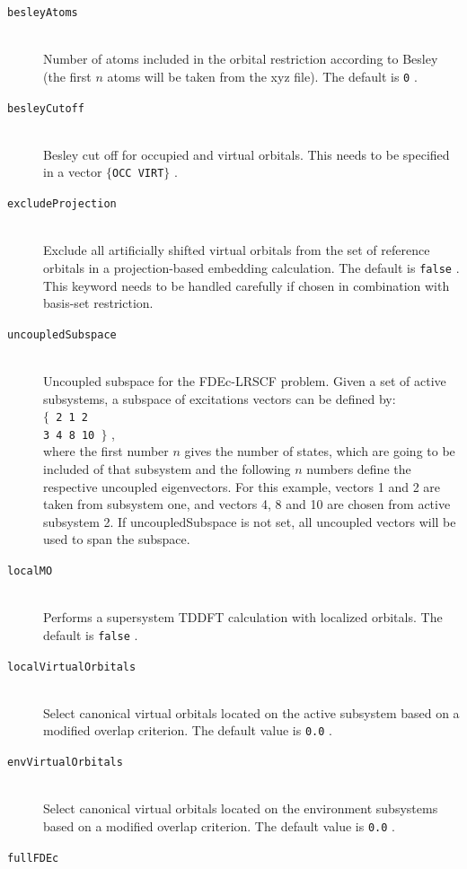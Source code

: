 \documentclass[bibliography=totocnumbered,a4paper,10pt,oneside]{scrbook}
\newcommand{\ttt}[1]{%
  \begingroup\setlength{\fboxsep}{1pt}%
  \colorbox{serenity-green!30}{\texttt{\hspace*{2pt}\vphantom{(g}#1\hspace*{2pt}}}%
  \endgroup
}
\begin{document}
\begin{description}
    \item [\texttt{besleyAtoms}]\hfill \\
    Number of atoms included in the orbital restriction according to Besley (the first $n$ atoms will be taken from the xyz file). The default is \ttt{0}.
    \item [\texttt{besleyCutoff}]\hfill \\
    Besley cut off for occupied and virtual orbitals. This needs to be specified in a vector \ttt{$\{$OCC VIRT$\}$}.
    \item [\texttt{excludeProjection}]\hfill \\
    Exclude all artificially shifted virtual orbitals from the set of reference orbitals in a projection-based embedding calculation. The default is \ttt{false}. This keyword needs to be handled carefully if chosen in combination with basis-set restriction.
    \item [\texttt{uncoupledSubspace}]\hfill \\
    Uncoupled subspace for the FDEc-LRSCF problem. Given a set of active subsystems, a subspace of excitations vectors can be defined by: \\  \ttt{$\{$ 2 1 2} \\
    \ttt{3 4 8 10 $\}$}, \\ where the first number $n$ gives the number of states, which are going to be included of that subsystem and the following $n$ numbers define the respective uncoupled eigenvectors. For this example, vectors 1 and 2 are taken from subsystem one, and vectors 4, 8 and 10 are chosen from active subsystem 2. If uncoupledSubspace is not set, all uncoupled vectors will be used to span the subspace.
    \item [\texttt{localMO}]\hfill \\
    Performs a supersystem TDDFT calculation with localized orbitals. The default is \ttt{false}.
    \item [\texttt{localVirtualOrbitals}]\hfill \\
    Select canonical virtual orbitals located on the active subsystem based on a modified overlap criterion. The default value is \ttt{0.0}.
    \item [\texttt{envVirtualOrbitals}]\hfill \\
    Select canonical virtual orbitals located on the environment subsystems based on a modified overlap criterion. The default value is \ttt{0.0}.
    \item [\texttt{fullFDEc}]\hfill \\

\end{description}
\end{document}
